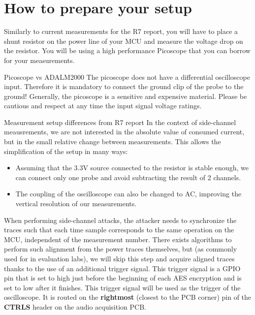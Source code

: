\section{How to prepare your setup}
Similarly to current measurements for the R7 report, you will have to place a shunt resistor on the power line of your MCU and measure the voltage drop on the resistor. You will be using a high performance Picoscope that you can borrow for your measurements.
\begin{bclogo}[couleur = gray!20, arrondi = 0.2, logo=\bcattention]{Picoscope vs ADALM2000}
The picoscope does not have a differential oscilloscope input. Therefore it is mandatory to connect the ground clip of the probe to the ground! Generally, the picoscope is a sensitive and expensive material. Please be cautious and respect at any time the input signal voltage ratings.
\end{bclogo}

\begin{bclogo}[couleur = gray!20, arrondi = 0.2, logo=\bcinfo]{Measurement setup differences from R7 report}
In the context of side-channel meausrements, we are not interested in the absolute value of consumed current, but in the small relative change between measurements. This allows the simplification of the setup in many ways:
\begin{itemize}
    \item Assuming that the 3.3V source connected to the resistor is stable enough, we can connect only one probe and avoid subtracting the result of 2 channels.
    \item The coupling of the oscilloscope can also be changed to AC, improving the vertical resolution of our measurements.
\end{itemize}
\end{bclogo}
When performing side-channel attacks, the attacker needs to synchronize the traces such that each time sample corresponds to the same operation on the MCU, independent of the measurement number. There exists algorithms to perform such alignment from the power traces themselves, but (as commonly used for in evaluation labs), we will skip this step and acquire aligned traces thanks to the use of an additional trigger signal. This trigger signal is a GPIO pin that is set to high just before the beginning of each AES encryption and is set to low after it finishes. This trigger signal will be used as the trigger of the oscilloscope. It is routed on the \textbf{rightmost} (closest to the PCB corner) pin of the \textbf{CTRLS} header on the audio acquisition PCB.

